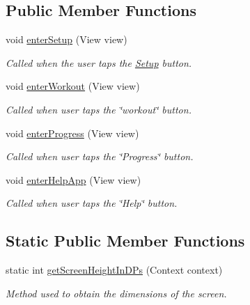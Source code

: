 \subsection*{Public Member Functions}
\begin{DoxyCompactItemize}
\item 
void \mbox{\hyperlink{classcom_1_1example_1_1trainawearapplication_1_1_main_activity_aeb1226f930e5d26a0aa04fc7614f3618}{enter\+Setup}} (View view)
\begin{DoxyCompactList}\small\item\em Called when the user taps the \mbox{\hyperlink{classcom_1_1example_1_1trainawearapplication_1_1_setup}{Setup}} button. \end{DoxyCompactList}\item 
void \mbox{\hyperlink{classcom_1_1example_1_1trainawearapplication_1_1_main_activity_a1f9bee72c098b97dc196ab9b9af6fe00}{enter\+Workout}} (View view)
\begin{DoxyCompactList}\small\item\em Called when user taps the \char`\"{}workout\char`\"{} button. \end{DoxyCompactList}\item 
void \mbox{\hyperlink{classcom_1_1example_1_1trainawearapplication_1_1_main_activity_a981791c0f63196acc0294ea82e1ff73a}{enter\+Progress}} (View view)
\begin{DoxyCompactList}\small\item\em Called when user taps the \char`\"{}\+Progress\char`\"{} button. \end{DoxyCompactList}\item 
void \mbox{\hyperlink{classcom_1_1example_1_1trainawearapplication_1_1_main_activity_a8f0652f7fc7f760d577d47b9ee3f9886}{enter\+Help\+App}} (View view)
\begin{DoxyCompactList}\small\item\em Called when user taps the \char`\"{}\+Help\char`\"{} button. \end{DoxyCompactList}\end{DoxyCompactItemize}
\subsection*{Static Public Member Functions}
\begin{DoxyCompactItemize}
\item 
static int \mbox{\hyperlink{classcom_1_1example_1_1trainawearapplication_1_1_main_activity_a9602d3869b7b5392704fbf9fc2b041a9}{get\+Screen\+Height\+In\+D\+Ps}} (Context context)
\begin{DoxyCompactList}\small\item\em Method used to obtain the dimensions of the screen. \end{DoxyCompactList}\end{DoxyCompactItemize}
